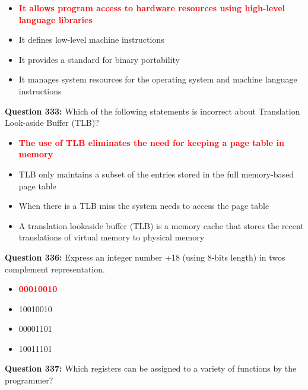 \documentclass[12pt,a4paper]{article}
\begin{document}
\begin{itemize}
    \item[\textbf{A.}] \textcolor{red}{\textbf{It allows program access to hardware resources using high-level language libraries}}
    \item[\textbf{B.}] It defines low-level machine instructions
    \item[\textbf{C.}] It provides a standard for binary portability
    \item[\textbf{D.}] It manages system resources for the operating system and machine language instructions
\end{itemize}

\vspace{0.5cm}

\textbf{Question 333:} Which of the following statements is incorrect about Translation Look-aside Buffer (TLB)?

\begin{itemize}
    \item[\textbf{A.}] \textcolor{red}{\textbf{The use of TLB eliminates the need for keeping a page table in memory}}
    \item[\textbf{B.}] TLB only maintains a subset of the entries stored in the full memory-based page table
    \item[\textbf{C.}] When there is a TLB miss the system needs to access the page table
    \item[\textbf{D.}] A translation lookaside buffer (TLB) is a memory cache that stores the recent translations of virtual memory to physical memory
\end{itemize}

\vspace{0.5cm}

\textbf{Question 336:} Express an integer number +18 (using 8-bits length) in twos complement representation.

\begin{itemize}
    \item[\textbf{A.}] \textcolor{red}{\textbf{00010010}}
    \item[\textbf{B.}] 10010010
    \item[\textbf{C.}] 00001101
    \item[\textbf{D.}] 10011101
\end{itemize}

\vspace{0.5cm}

\textbf{Question 337:} Which registers can be assigned to a variety of functions by the programmer?
\end{document}
